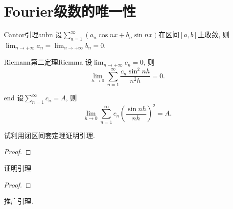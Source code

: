 \section{Fourier级数的唯一性}
\begin{lemma}{Cantor引理}{anbn}
设\(\sum_{n=1}^{\infty}\left(a_n\cos nx+b_n\sin nx\right)\)在区间\([a,b]\)上收敛, 则\(\lim_{n\rightarrow+\infty}a_n=\lim_{n\rightarrow+\infty}b_n=0\).
\end{lemma}
\begin{lemma}{Riemann第二定理}{Riemma}
设\(\lim_{n\rightarrow+\infty}c_n=0\), 则\[\lim_{h\rightarrow 0}\sum_{n=1}^{\infty}\frac{c_n\sin^2nh}{n^2h}=0.\]
\end{lemma}
\begin{lemma}{}{end}
设\(\sum_{n=1}^{\infty}c_n=A\), 则\[\lim_{h\rightarrow 0}\sum_{n=1}^{\infty}c_n\left(\frac{\sin nh}{nh}\right)^2=A.\]
\end{lemma}
\begin{quiza}
\woe 试利用闭区间套定理证明引理.
\begin{proof}

\end{proof}
\woe 证明引理
\begin{proof}

\end{proof}
\end{quiza}
\begin{quizb}
\woe 推广引理.
\begin{solution}

\end{solution}
\end{quizb}